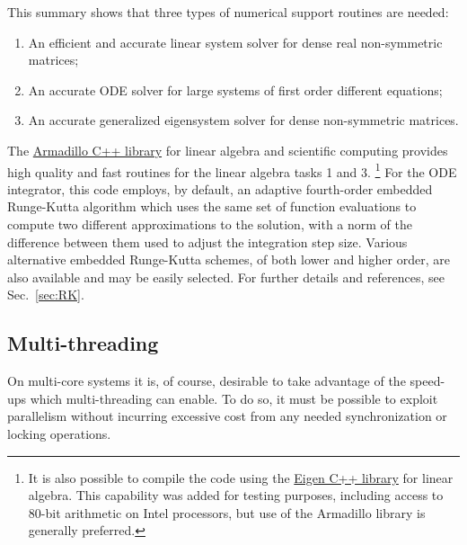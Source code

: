 \documentclass [12pt]{article}
\begin{document}
This summary shows that three types of numerical support routines
are needed:
\begin{enumerate}\advance\itemsep -6pt
\item
    An efficient and accurate linear system solver for
    dense real non-symmetric matrices;
\item
    An accurate ODE solver for large systems of first order 
    different equations;
\item
    An accurate generalized eigensystem solver for dense
    non-symmetric matrices.
\end{enumerate}
The \href{https://arma.sourceforge.net}{Armadillo C++ library}
for linear algebra and scientific computing provides high
quality and fast routines for the linear algebra tasks 1 and 3.%
\footnote
    {%
    It is also possible to compile the code using the 
    \href{https://libeigen.gitlab.io/}{Eigen C++ library}
    for linear algebra.
    This capability was added
    for testing purposes, including access to 80-bit arithmetic
    on Intel processors, but use of the Armadillo library is
    generally preferred.
    }
For the ODE integrator, this code employs, by default, an adaptive
fourth-order embedded Runge-Kutta algorithm \cite{SS32}
which uses the same set of function evaluations to compute
two different approximations to the solution,
with a norm of the difference between them used to adjust
the integration step size.
Various alternative embedded Runge-Kutta schemes, of both
lower and higher order, are also available and may be easily selected.
For further details and references, see Sec.~\ref{sec:RK}.

\subsection {Multi-threading}

On multi-core systems it is, of course, desirable to take
advantage of the speed-ups which multi-threading can enable.
To do so, it must be possible to exploit parallelism without
incurring excessive cost from any needed synchronization or
locking operations.
\end{document}

